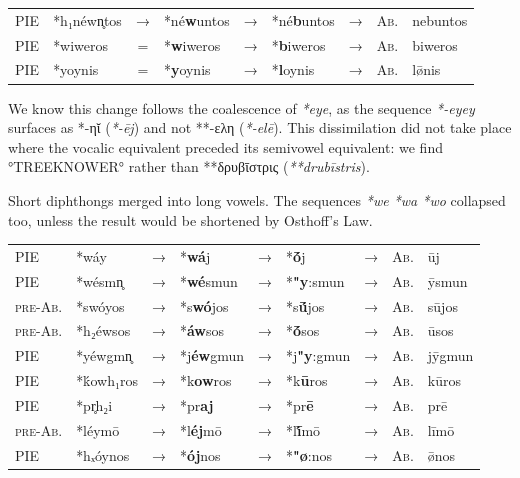 \documentclass[svgnames,x11names,b5paper]{book}
\begin{document}
            \begin{table}[H]
                \begin{center}
                \begin{tabular}{llcllllll}
                \textsc{PIE} & *h₁néwn̥tos & → & *né\textbf{w}untos & → & *né\textbf{b}untos & → & \textsc{Ab.} & nebuntos\\
                \textsc{PIE} & *wiweros & = & *\textbf{w}iweros & → & *\textbf{b}iweros & → & \textsc{Ab.} & biweros\\
                \textsc{PIE} & *yoynis & = & *\textbf{y}oynis & → & *\textbf{l}oynis & → & \textsc{Ab.} & lø̄nis\\
                \end{tabular}
                \end{center}
                \end{table}
        
            We know this change follows the coalescence of \textit{*eye}, as the sequence \textit{*-eyey} surfaces as *-ηῐ (\textit{*-ēj}) and not **-ελη (\textit{*-elē}). This dissimilation did not take place where the vocalic equivalent preceded its semivowel equivalent: we find °TREEKNOWER° rather than **δρυβῑστρις (\textit{**drubīstris}).

        Short diphthongs merged into long vowels. The sequences \textit{*we *wa *wo} collapsed too, unless the result would be shortened by Osthoff's Law.

            \begin{table}[H]
                \begin{center}
                \begin{tabular}{llcllllll}
                \textsc{PIE} & *wáy & → & *\textbf{wá}j & → & *\textbf{ṓ}j & → & \textsc{Ab.} & ūj\\
                \textsc{PIE} & *wésmn̥ & → & *\textbf{wé}smun & → & *\textbf{"y}:smun & → & \textsc{Ab.} & ȳsmun\\
                \textsc{pre-Ab.} & *swóyos & → & *s\textbf{wó}jos & → & *s\textbf{ū́}jos & → & \textsc{Ab.} & sūjos\\
                \textsc{pre-Ab.} & *h₂éwsos & → & *\textbf{áw}sos & → & *\textbf{ṓ}sos & → & \textsc{Ab.} & ūsos\\
                \textsc{PIE} & *yéwgmn̥ & → & *j\textbf{éw}gmun & → & *j\textbf{"y}:gmun & → & \textsc{Ab.} & jȳgmun\\
                \textsc{PIE} & *ḱowh₁ros & → & *k\textbf{ow}ros & → & *k\textbf{ū}ros & → & \textsc{Ab.} & kūros\\
                \textsc{PIE} & *pr̥h₂i & → & *pr\textbf{aj} & → & *pr\textbf{ē} & → & \textsc{Ab.} & prē\\
                \textsc{pre-Ab.} & *léymō & → & *l\textbf{éj}mō & → & *l\textbf{ī́}mō & → & \textsc{Ab.} & līmō\\
                \textsc{PIE} & *hₓóynos & → & *\textbf{ój}nos & → & *\textbf{"ø}:nos & → & \textsc{Ab.} & ø̄nos\\
                \end{tabular}
                \end{center}
                \end{table}
        
\end{document}
